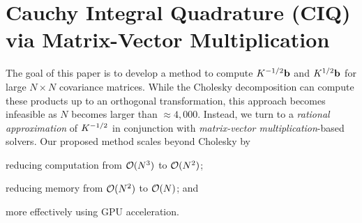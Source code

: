 \section{Cauchy Integral Quadrature (CIQ) via Matrix-Vector Multiplication}
\label{sec:ciq_method}

The goal of this paper is to develop a method to compute $K^{-1/2} \mathbf{b}$ and $K^{1/2} \mathbf{b}$ for large $N \times N$ covariance matrices.
While the Cholesky decomposition can compute these products up to an orthogonal transformation, this approach becomes infeasible as $N$ becomes larger than $\approx 4,\!000$.
Instead, we turn to a \emph{rational approximation} of $K^{-1/2}$ in conjunction with \emph{matrix-vector multiplication}-based solvers.
Our proposed method scales beyond Cholesky by
\begin{enumerate*}
  \item reducing computation from $\bigo{N^3}$ to $\bigo{N^2}$;
  \item reducing memory from $\bigo{N^2}$ to $\bigo{N}$; and
  \item more effectively using GPU acceleration.
\end{enumerate*}

